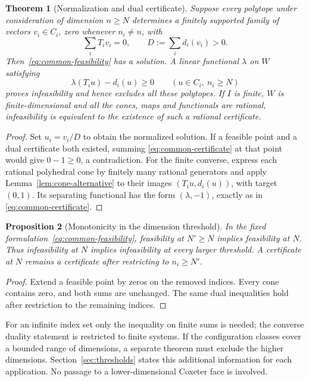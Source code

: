 \documentclass[11pt]{article}
\newtheorem{theorem}{Theorem}[section]
\newtheorem{proposition}[theorem]{Proposition}
\theoremstyle{definition}
\theoremstyle{remark}
\numberwithin{equation}{section}
\begin{document}
\begin{theorem}[Normalization and dual certificate]
\label{thm:homogeneous-certificate}
Suppose every polytope under consideration of dimension $n\ge N$
determines a finitely supported family of vectors $v_i\in C_i$,
zero whenever $n_i\ne n$, with
\[
             \sum_iT_iv_i=0,\qquad D:=\sum_id_i(v_i)>0.
\]
Then~\eqref{eq:common-feasibility} has a solution.
A linear functional $\lambda$ on $W$ satisfying
\begin{equation}\label{eq:common-certificate}
       \lambda(T_iu)-d_i(u)\ge0
       \qquad(u\in C_i,\ n_i\ge N)
\end{equation}
proves infeasibility and hence excludes all these polytopes.
If $I$ is finite, $W$ is finite-dimensional and all the cones, maps
and functionals are rational, infeasibility is equivalent to the
existence of such a rational certificate.
\end{theorem}
\begin{proof}
Set $u_i=v_i/D$ to obtain the normalized solution. If a feasible
point and a dual certificate both existed, summing
\eqref{eq:common-certificate} at that point would give
$0-1\ge0$, a contradiction.
For the finite converse, express each rational polyhedral cone by
finitely many rational generators and apply
Lemma~\ref{lem:cone-alternative} to their images
$(T_iu,d_i(u))$, with target $(0,1)$. Its separating functional has
the form $(\lambda,-1)$, exactly as in
\eqref{eq:common-certificate}.
\end{proof}

\begin{proposition}[Monotonicity in the dimension threshold]\label{prop:threshold}
In the fixed formulation~\eqref{eq:common-feasibility}, feasibility
at $N'\ge N$ implies feasibility at $N$. Thus infeasibility at $N$
implies infeasibility at every larger threshold. A certificate at
$N$ remains a certificate after restricting to $n_i\ge N'$.
\end{proposition}
\begin{proof}
Extend a feasible point by zeros on the removed indices. Every cone
contains zero, and both sums are unchanged. The same dual inequalities hold after restriction to the remaining
indices.
\end{proof}

For an infinite index set only the inequality on finite sums is
needed; the converse duality statement is restricted to finite
systems. If the configuration classes cover a bounded range of
dimensions, a separate theorem must exclude the higher dimensions.
Section~\ref{sec:thresholds} states this additional information for
each application. No passage to a lower-dimensional Coxeter face
is involved.
\end{document}
